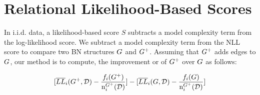 \documentclass{article}
\begin{document}
\begin{table*}[tb]\centering
{}
\caption{For the node $\it{Age(User)}$, and the IMDb dataset, the contribution of one family configuration to the unnormalized resp. normalized log-likelihood score. Top: For the $G_{1}$ structure of Figure~\ref{fig:bn}. Bottom: For the expanded structure $G_{1}^+$.
\label{table:likelihood-example}}
\end{table*}


\section{Relational Likelihood-Based Scores}

In i.i.d. data, a likelihood-based score $S$ subtracts a model complexity term from the log-likelihood score. We subtract a model complexity term from the NLL score to compare two BN structures $G$ and $G^{+}$. Assuming that $G^{+}$ adds edges to $G$, our method is to compute, the improvement or  of $G^{+}$ over $G$ as follows: 

\begin{equation}\label{eq:nll-diff}
[\overline{LL}_{i}(G^{+}, {\mathcal{D}})-\frac{f_{i}(G^{+})}{\mathrm{n}^{G^{+}}_{i}(\mathcal{D})}] - [\overline{LL}_{i}(G,\mathcal{D})-\frac{f_{i}(G)}{\mathrm{n}^{G^{+}}_{i}(\mathcal{D})}]
\end{equation}
\end{document}

